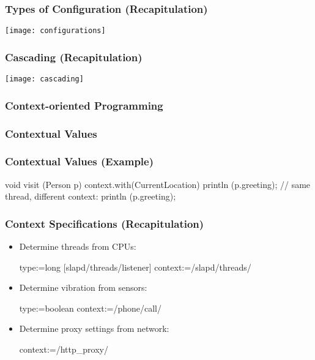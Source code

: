 \begin{frame}
	\frametitle{Types of Configuration (Recapitulation)}
	\begin{description}
	\end{description}
\end{frame}

\begin{frame}
	\hspace*{-1em}\texttt{[image: configurations]}
\end{frame}

\begin{frame}
	\frametitle{Cascading (Recapitulation)}
	\texttt{[image: cascading]}
\end{frame}

\begin{frame}
	\frametitle{Context-oriented Programming}
\end{frame}

\begin{frame}
	\frametitle{Contextual Values}
\end{frame}

\begin{frame}[fragile]
	\frametitle{Contextual Values (Example)}
	\begin{code}[gobble=4]
	void visit (Person p)
	{
		context.with(CurrentLocation)
		{
			println (p.greeting);
		}
		// same thread, different context:
		println (p.greeting);
	}
	\end{code}
\end{frame}

\begin{frame}[fragile]
	\frametitle{Context Specifications (Recapitulation)}

	\begin{itemize}
	\item
	Determine threads from CPUs:

	\begin{code}
	  type:=long
	[slapd/threads/listener]
	  context:=/slapd/threads/%
	\end{code}

	\item
	Determine vibration from sensors:

	\begin{code}
	  type:=boolean
	  context:=/phone/call/%
	\end{code}

	\item
	Determine proxy settings from network:

	\begin{code}
	  context:=/http_proxy/%
	\end{code}
	\end{itemize}
\end{frame}

